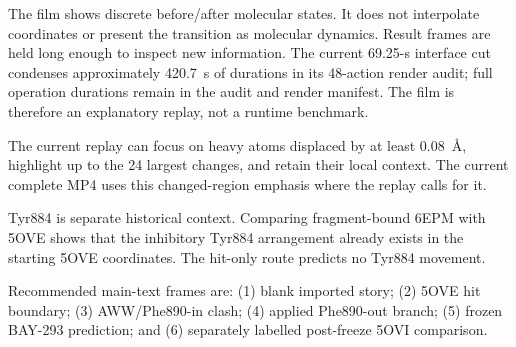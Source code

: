 The film shows discrete before/after molecular states. It does not interpolate
coordinates or present the transition as molecular dynamics. Result frames are
held long enough to inspect new information. The current 69.25-s interface cut
condenses approximately 420.7~s of durations in its 48-action render audit;
full operation durations remain in the audit and render manifest. The film is
therefore an explanatory replay, not a runtime benchmark.

The current replay can focus on heavy atoms displaced by at least 0.08~\AA{},
highlight up to the 24 largest changes, and retain their local context. The
current complete MP4 uses this changed-region emphasis where the replay calls
for it.

Tyr884 is separate historical context. Comparing fragment-bound 6EPM with 5OVE
shows that the inhibitory Tyr884 arrangement already exists in the starting
5OVE coordinates. The hit-only route predicts no Tyr884 movement.

Recommended main-text frames are: (1) blank imported story; (2) 5OVE hit
boundary; (3) AWW/Phe890-in clash; (4) applied Phe890-out branch; (5) frozen
BAY-293 prediction; and (6) separately labelled post-freeze 5OVI comparison.
